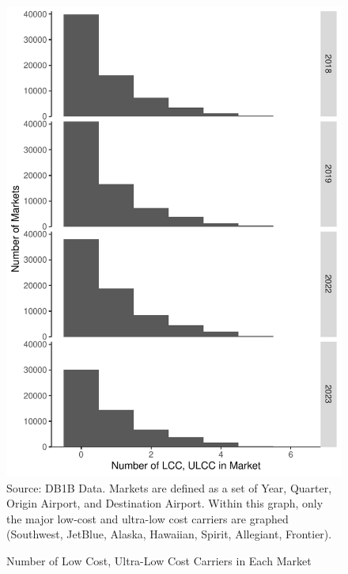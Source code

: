 \documentclass{article}
\begin{document}
\begin{appendices}
\begin{figure}
	\caption{Number of Low Cost, Ultra-Low Cost Carriers in Each Market}
	\label{fig:LCC_Count}
	\includegraphics[width = \linewidth]{LCC_Density}
	\footnotesize{Source: DB1B Data. Markets are defined as a set of Year, Quarter, Origin Airport, and Destination Airport. Within this graph, only the major low-cost and ultra-low cost carriers are graphed (Southwest, JetBlue, Alaska, Hawaiian, Spirit, Allegiant, Frontier).}
\end{figure}


\end{appendices}
\end{document}
